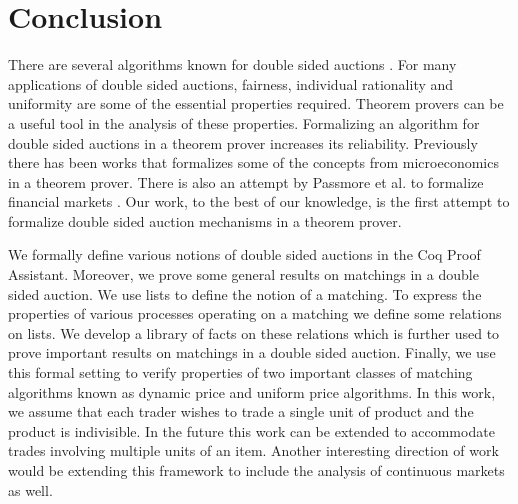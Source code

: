 \documentclass[a4paper,UKenglish,cleveref, autoref]{lipics-v2019}
\begin{document}
\section{Conclusion}\label{sec:conclusion}
There are several algorithms known for double sided auctions \cite{Deshmukh:2002:TCD}. For many applications of double sided auctions, fairness, individual rationality and uniformity are some of the essential properties required. Theorem provers can be a useful tool in the analysis of these properties. Formalizing an algorithm for double sided auctions in a theorem prover increases its reliability. Previously there has been works that formalizes some of the concepts from microeconomics \cite{toolbox,welfare} in a theorem prover. There is also an  attempt by Passmore et al. to formalize financial markets \cite{PassmoreI17}. Our work, to the best of our knowledge, is the first attempt to formalize double sided auction mechanisms in a theorem prover.

We formally define various notions of double sided auctions in the Coq Proof Assistant.
Moreover, we prove some general results on matchings in a double sided auction. We use
lists to define the notion of a matching. To express the properties
of various processes operating on a matching we define some relations on lists. We develop a library of facts on these relations which is further used to prove
important results on matchings in a double sided auction. Finally, we use this formal setting
to verify properties of two important classes of matching algorithms known as dynamic price
and uniform price algorithms. In this work, we assume that each trader wishes
to trade a single unit of product and the product is indivisible. In the future this work can be
extended to accommodate trades involving multiple units of an item. Another interesting direction of work
would be extending this framework to include the analysis of continuous markets as well.


\end{document}
